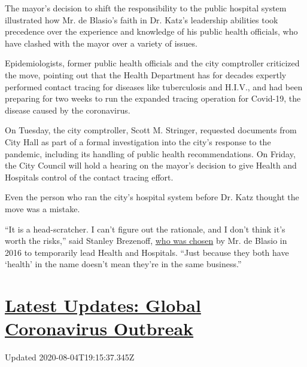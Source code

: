 The mayor's decision to shift the responsibility to the public hospital
system illustrated how Mr. de Blasio's faith in Dr. Katz's leadership
abilities took precedence over the experience and knowledge of his
public health officials, who have clashed with the mayor over a variety
of issues.

Epidemiologists, former public health officials and the city comptroller
criticized the move, pointing out that the Health Department has for
decades expertly performed contact tracing for diseases like
tuberculosis and H.I.V., and had been preparing for two weeks to run the
expanded tracing operation for Covid-19, the disease caused by the
coronavirus.

On Tuesday, the city comptroller, Scott M. Stringer, requested documents
from City Hall as part of a formal investigation into the city's
response to the pandemic, including its handling of public health
recommendations. On Friday, the City Council will hold a hearing on the
mayor's decision to give Health and Hospitals control of the contact
tracing effort.

Even the person who ran the city's hospital system before Dr. Katz
thought the move was a mistake.

``It is a head-scratcher. I can't figure out the rationale, and I don't
think it's worth the risks,'' said Stanley Brezenoff,
\href{https://www.nytimes.com/2016/11/08/nyregion/chief-of-new-yorks-struggling-public-hospital-system-is-resigning.html}{who
was chosen} by Mr. de Blasio in 2016 to temporarily lead Health and
Hospitals. ``Just because they both have `health' in the name doesn't
mean they're in the same business.''

\hypertarget{latest-updates-global-coronavirus-outbreak}{%
\section{\texorpdfstring{\href{https://www.nytimes.com/2020/08/04/world/coronavirus-cases.html?action=click\&pgtype=Article\&state=default\&region=MAIN_CONTENT_1\&context=storylines_live_updates}{Latest
Updates: Global Coronavirus
Outbreak}}{Latest Updates: Global Coronavirus Outbreak}}\label{latest-updates-global-coronavirus-outbreak}}

Updated 2020-08-04T19:15:37.345Z

